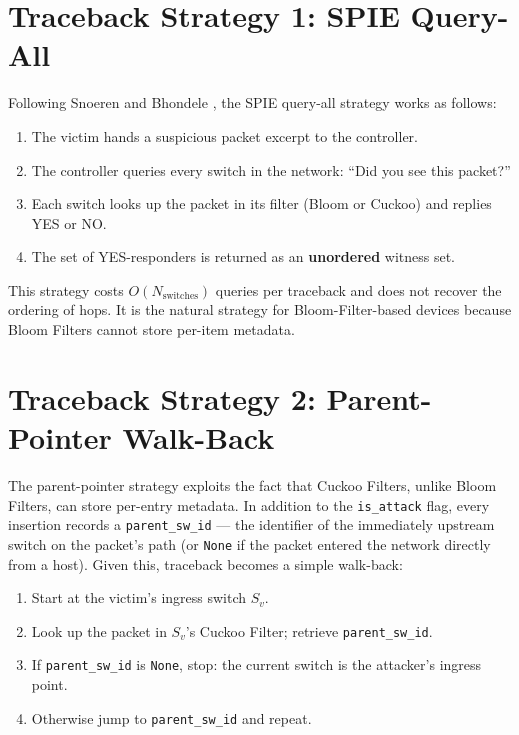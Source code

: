 \documentclass[12pt, a4paper]{report}
\begin{document}
\section{Traceback Strategy 1: SPIE Query-All}

Following Snoeren \cite{snoeren2001spie} and Bhondele \cite{shesha2015},
the SPIE query-all strategy works as follows:

\begin{enumerate}[leftmargin=*]
  \item The victim hands a suspicious packet excerpt to the controller.
  \item The controller queries every switch in the network:
  ``Did you see this packet?''
  \item Each switch looks up the packet in its filter (Bloom or Cuckoo)
  and replies YES or NO.
  \item The set of YES-responders is returned as an \textbf{unordered}
  witness set.
\end{enumerate}

This strategy costs $O(N_{\text{switches}})$ queries per traceback and
does not recover the ordering of hops. It is the natural strategy for
Bloom-Filter-based devices because Bloom Filters cannot store per-item
metadata.

\section{Traceback Strategy 2: Parent-Pointer Walk-Back}

The parent-pointer strategy exploits the fact that Cuckoo Filters, unlike
Bloom Filters, can store per-entry metadata. In addition to the
\texttt{is\_attack} flag, every insertion records a
\texttt{parent\_sw\_id} --- the identifier of the immediately upstream
switch on the packet's path (or \texttt{None} if the packet entered the
network directly from a host). Given this, traceback becomes a simple
walk-back:

\begin{enumerate}[leftmargin=*]
  \item Start at the victim's ingress switch $S_v$.
  \item Look up the packet in $S_v$'s Cuckoo Filter; retrieve
  \texttt{parent\_sw\_id}.
  \item If \texttt{parent\_sw\_id} is \texttt{None}, stop: the current
  switch is the attacker's ingress point.
  \item Otherwise jump to \texttt{parent\_sw\_id} and repeat.
\end{enumerate}
\end{document}
